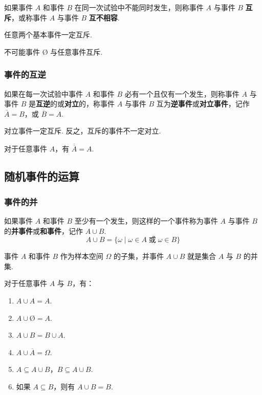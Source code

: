 如果事件 $A$ 和事件 $B$ 在同一次试验中不能同时发生，则称事件 $A$ 与事件 $B$ \textbf{互斥}，或称事件 $A$ 与事件 $B$ \textbf{互不相容}.

任意两个基本事件一定互斥.

不可能事件 $\text{\O}$ 与任意事件互斥.

\subsubsection{事件的互逆}

如果在每一次试验中事件 $A$ 和事件 $B$ 必有一个且仅有一个发生，则称事件 $A$ 与事件 $B$ 是\textbf{互逆}的或\textbf{对立}的，称事件 $A$ 与事件 $B$ 互为\textbf{逆事件}或\textbf{对立事件}，记作 $\overline{A}=B$，或 $\overline{B}=A$.

对立事件一定互斥. 反之，互斥的事件不一定对立.

\begin{property}
    \indent 对于任意事件 $A$，有 $\overline{\overline{A}}=A$.
\end{property}

\subsection{随机事件的运算}

\subsubsection{事件的并}

如果事件 $A$ 和事件 $B$ 至少有一个发生，则这样的一个事件称为事件 $A$ 与事件 $B$ 的\textbf{并事件}或\textbf{和事件}，记作 $A \cup B$.
$$
A \cup B = \{ \omega \mid \omega \in A \;\text{或}\; \omega \in B \}
$$

事件 $A$ 和事件 $B$ 作为样本空间 $\varOmega$ 的子集，并事件 $A \cup B$ 就是集合 $A$ 与 $B$ 的并集.

\begin{property}
    \indent 对于任意事件 $A$ 与 $B$，有：
    \begin{enumerate}
        \item $A \cup A = A$.
        \item $A \cup \text{\O} = A$.
        \item $A \cup B = B \cup A$.
        \item $A \cup \overline{A} = \varOmega$.
        \item $A \subseteq A \cup B$，$B \subseteq A \cup B$.
        \item 如果 $A \subseteq B$，则有 $A \cup B=B$.
    \end{enumerate}
\end{property}

